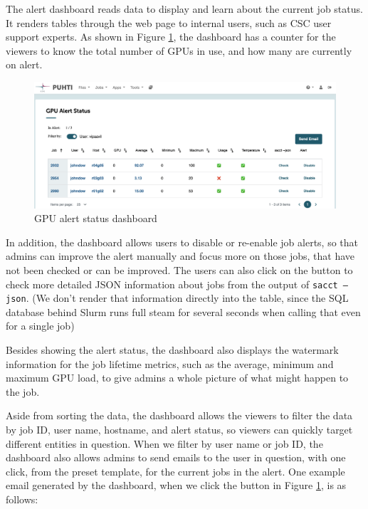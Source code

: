 The alert dashboard reads data to display and learn about the current job status. It renders tables through the web page to internal users, such as CSC user support experts. As shown in Figure \ref{fig_status_dashboard}, the dashboard has a counter for the viewers to know the total number of GPUs in use, and how many are currently on alert. 

\begin{figure}[H]
    \centering
    \includegraphics[width=1.1\textwidth]{figures/status-dashboard.png}
    \caption{GPU alert status dashboard}
    \label{fig_status_dashboard}
\end{figure}

In addition, the dashboard allows users to disable or re-enable job alerts, so that admins can improve the alert manually and focus more on those jobs, that have not been checked or can be improved. The users can also click on the button to check more detailed JSON information about jobs from the output of \texttt{sacct --json}. (We don't render that information directly into the table, since the SQL database behind Slurm runs full steam for several seconds when calling that even for a single job)

Besides showing the alert status, the dashboard also displays the watermark information for the job lifetime metrics, such as the average, minimum and maximum GPU load, to give admins a whole picture of what might happen to the job.

Aside from sorting the data, the dashboard allows the viewers to filter the data by job ID, user name, hostname, and alert status, so viewers can quickly target different entities in question. When we filter by user name or job ID, the dashboard also allows admins to send emails to the user in question, with one click, from the preset template, for the current jobs in the alert. One example email generated by the dashboard, when we click the button in Figure \ref{fig_status_dashboard}, is as follows:


